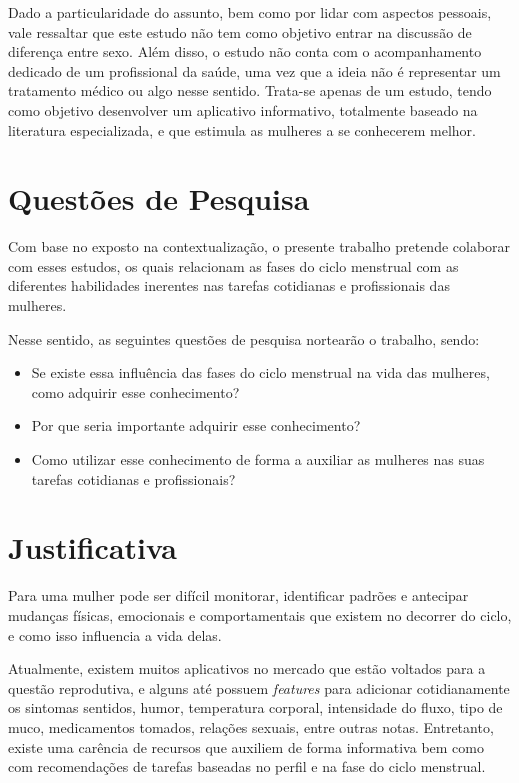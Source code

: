 Dado a particularidade do assunto, bem como por lidar com aspectos pessoais, vale ressaltar que este 
estudo não tem como objetivo entrar na discussão de diferença entre sexo. Além disso, o estudo não 
conta com o acompanhamento dedicado de um profissional da saúde, uma vez que a ideia não é representar 
um tratamento médico ou algo nesse sentido. Trata-se apenas de um estudo, tendo como objetivo desenvolver 
um aplicativo informativo, totalmente baseado na literatura especializada, e que estimula as mulheres a 
se conhecerem melhor. 


\section{Questões de Pesquisa}

Com base no exposto na contextualização, o presente trabalho pretende colaborar com esses estudos, 
os quais relacionam as fases do ciclo menstrual com as diferentes habilidades inerentes nas tarefas 
cotidianas e profissionais das mulheres.

Nesse sentido, as seguintes questões de pesquisa nortearão o trabalho, sendo:

\begin{itemize}

        \item Se existe essa influência das fases do ciclo menstrual na vida das mulheres, como adquirir esse conhecimento?

        \item Por que seria importante adquirir esse conhecimento? 

        \item Como utilizar esse conhecimento de forma a auxiliar as mulheres nas suas tarefas cotidianas e profissionais?

\end{itemize}

\section{Justificativa}

Para uma mulher pode ser difícil monitorar, identificar padrões e antecipar mudanças físicas, 
emocionais e comportamentais que existem no decorrer do ciclo, e como isso influencia a vida delas.

Atualmente, existem muitos aplicativos no mercado que estão voltados para a questão reprodutiva, 
e alguns até possuem \textit{features} para adicionar cotidianamente os sintomas sentidos, humor, 
temperatura corporal, intensidade do fluxo, tipo de muco, medicamentos tomados, relações sexuais, 
entre outras notas. Entretanto, existe uma carência de recursos que auxiliem de forma informativa bem 
como com recomendações de tarefas baseadas no perfil e na fase do ciclo menstrual.

